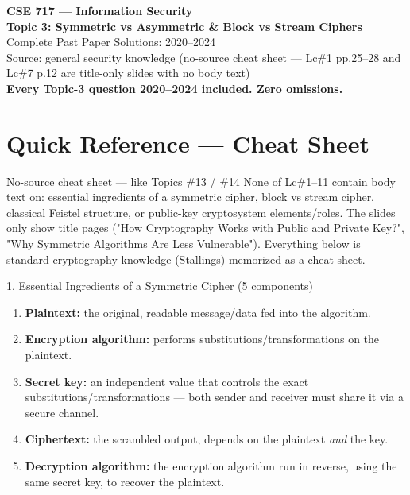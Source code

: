 \documentclass[12pt,a4paper]{article}
\begin{document}
\begin{center}
{\LARGE\bfseries\color{folblue} CSE 717 --- Information Security}\\[4pt]
{\large\bfseries Topic 3: Symmetric vs Asymmetric \& Block vs Stream Ciphers}\\[2pt]
{\large Complete Past Paper Solutions: 2020--2024}\\[6pt]
{\normalsize Source: general security knowledge (no-source cheat sheet --- Lc\#1 pp.25--28 and Lc\#7 p.12 are title-only slides with no body text)}\\[2pt]
{\normalsize\color{darkred}\textbf{Every Topic-3 question 2020--2024 included. Zero omissions.}}
\end{center}

\tableofcontents
\newpage

\section*{Quick Reference --- Cheat Sheet}

\begin{warnbox}{No-source cheat sheet --- like Topics \#13 / \#14}
None of Lc\#1--11 contain body text on: essential ingredients of a symmetric cipher, block vs stream cipher, classical Feistel structure, or public-key cryptosystem elements/roles. The slides only show title pages ("How Cryptography Works with Public and Private Key?", "Why Symmetric Algorithms Are Less Vulnerable"). Everything below is standard cryptography knowledge (Stallings) memorized as a cheat sheet.
\end{warnbox}

\begin{algobox}{1. Essential Ingredients of a Symmetric Cipher (5 components)}
\begin{enumerate}[noitemsep]
  \item \textbf{Plaintext:} the original, readable message/data fed into the algorithm.
  \item \textbf{Encryption algorithm:} performs substitutions/transformations on the plaintext.
  \item \textbf{Secret key:} an independent value that controls the exact substitutions/transformations --- both sender and receiver must share it via a secure channel.
  \item \textbf{Ciphertext:} the scrambled output, depends on the plaintext \emph{and} the key.
  \item \textbf{Decryption algorithm:} the encryption algorithm run in reverse, using the same secret key, to recover the plaintext.
\end{enumerate}
\end{algobox}
\end{document}

